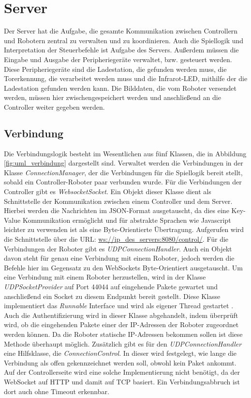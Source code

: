 \section{Server}
\label{impl:server}
Der Server hat die Aufgabe, die gesamte Kommunikation zwischen Controllern und Robotern zentral zu verwalten und zu koordinieren. Auch die Spiellogik und Interpretation der Steuerbefehle ist Aufgabe des Servers. Außerdem müssen die Eingabe und Ausgabe der Peripheriegeräte verwaltet, bzw. gesteuert werden. Diese Peripheriegeräte sind die Ladestation, die gefunden werden muss, die Torerkennung, die verarbeitet werden muss und die Infrarot-LED, mithilfe der die Ladestation gefunden werden kann. Die Bilddaten, die vom Roboter versendet werden, müssen hier zwischengespeichert werden und anschließend an die Controller weiter gegeben werden.

\subsection{Verbindung}
Die Verbindungslogik besteht im Wesentlichen aus fünf Klassen, die in Abbildung \ref{fig:uml_verbindung} dargestellt sind. Verwaltet werden die Verbindungen in der Klasse \textit{ConnectionManager}, der die Verbindungen für die Spiellogik bereit stellt, sobald ein Controller-Roboter paar verbunden wurde. Für die Verbindungen der Controller gibt es \textit{WebsocketSocket}. Ein Objekt dieser Klasse dient als Schnittstelle der Kommunikation zwischen einem Controller und dem Server. Hierbei werden die Nachrichten im JSON-Format ausgetauscht, da dies eine Key-Value Kommunikation ermöglicht und für abstrakte Sprachen wie Javascript leichter zu verwenden ist als eine Byte-Orientierte Übertragung. Aufgerufen wird die Schnittstelle über die URL: \url{ws://ip\_des\_servers:8080/control/}. Für die Verbindungen der Roboter gibt es \textit{UDPConnectionHandler}. Auch ein Objekt davon steht für genau eine Verbindung mit einem Roboter, jedoch werden die Befehle hier im Gegensatz zu den WebSockets Byte-Orientiert ausgetauscht. Um eine Verbindung mit einem Roboter herzustellen, wird in der Klasse \textit{UDPSocketProvider} auf Port 44044 auf eingehende Pakete gewartet und anschließend ein Socket zu diesem Endpunkt bereit gestellt. Diese Klasse implementiert das \textit{Runnable} Interface und wird als eigener Thread gestartet \cite{PROJEKT}.  Auch die Authentifizierung wird in dieser Klasse abgehandelt, indem überprüft wird, ob die eingehenden Pakete einer der IP-Adressen der Roboter zugeordnet werden können. Da die Roboter statische IP-Adressen bekommen sollen ist diese Methode überhaupt möglich. Zusätzlich gibt es für den \textit{UDPConnectionHandler} eine Hilfsklasse, die \textit{ConnectionControl}. In dieser wird festgelegt, wie lange die Verbindung als offen gekennzeichnet werden soll, obwohl kein Paket ankommt. Auf der Controllerseite wird eine solche Implementierung nicht benötigt, da der WebSocket auf HTTP und damit auf TCP basiert. Ein Verbindungsabbruch ist dort auch ohne Timeout erkennbar.


